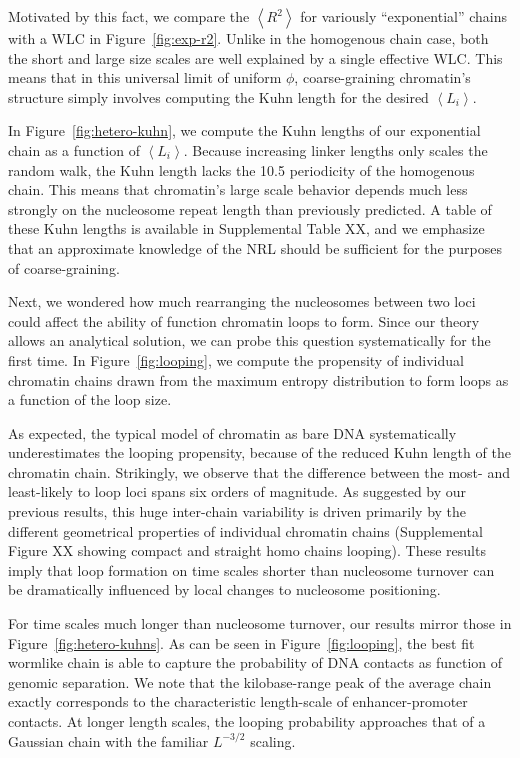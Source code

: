 \documentclass[%
 reprint,
superscriptaddress,
showpacs,preprintnumbers,
 amsmath,amssymb,
 aps,
 prl,
]{revtex4-1}
\newcommand{\RR}{\left\langle{}R^2\right\rangle{}}
\newcommand{\meanli}{\left\langle{}L_i\right\rangle}
\begin{document}
Motivated by this fact, we compare the $\RR$ for variously
    ``exponential'' chains  with a WLC in Figure~\ref{fig:exp-r2}.
Unlike in the homogenous chain case, both the short and large size scales are
    well explained by a single effective WLC.\@
This means that in this universal limit of uniform $\phi$, coarse-graining
    chromatin's structure simply involves computing the Kuhn length for the
    desired $\meanli$.

In Figure~\ref{fig:hetero-kuhn}, we compute the Kuhn lengths of our exponential
    chain as a function of $\meanli$.
Because increasing linker lengths only scales the random walk, the Kuhn length
    lacks the \SI{10.5}{\basepair} periodicity of the homogenous chain.
This means that chromatin's large scale behavior depends much less strongly on
    the nucleosome repeat length than previously predicted.
A table of these Kuhn lengths is available in Supplemental Table XX, and we
    emphasize that an approximate knowledge of the NRL should be sufficient for
    the purposes of coarse-graining.

Next, we wondered how much rearranging the nucleosomes between two
    loci could affect the ability of function chromatin loops to form.
Since our theory allows an analytical solution, we can probe this question
    systematically for the first time.
In Figure~\ref{fig:looping}, we compute the propensity of individual chromatin
    chains drawn from the maximum entropy distribution to form loops as a
    function of the loop size.

As expected, the typical model of chromatin as bare DNA systematically
    underestimates the looping propensity, because of the reduced Kuhn length of
    the chromatin chain.
Strikingly, we observe that the difference between the most- and least-likely to
    loop loci spans six orders of magnitude.
As suggested by our previous results, this huge inter-chain variability is
    driven primarily by the different geometrical properties of individual
    chromatin chains (Supplemental Figure XX showing compact and straight homo chains
    looping).
These results imply that loop formation on time scales shorter than nucleosome
    turnover can be dramatically influenced by local changes to nucleosome
    positioning.

For time scales much longer than nucleosome turnover, our results mirror those
    in Figure~\ref{fig:hetero-kuhns}.
As can be seen in Figure~\ref{fig:looping}, the best fit wormlike chain is able
    to capture the probability of DNA contacts as function of genomic separation.
We note that the kilobase-range peak of the average chain exactly corresponds to
    the characteristic length-scale of enhancer-promoter contacts.
At longer length scales, the looping probability approaches that of a Gaussian
    chain with the familiar $L^{-3/2}$ scaling.
\end{document}
